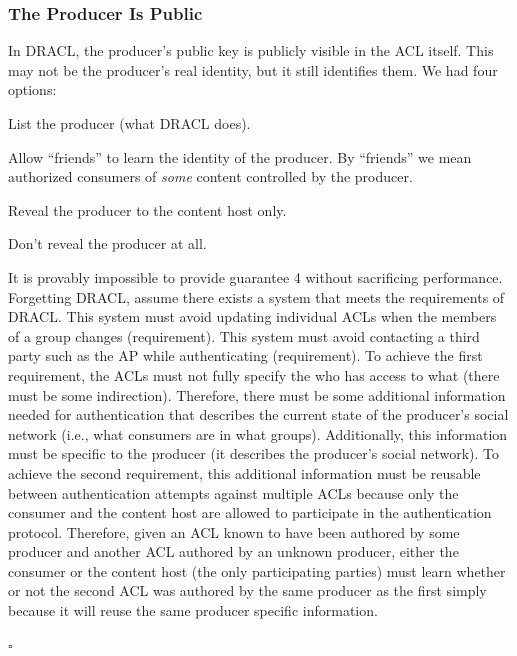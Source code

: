 \documentclass[pdftex,12pt,a4papaer,twoside,notitlepage]{report}
\begin{document}
\subsubsection{The Producer Is Public}
\label{sub:producer_public}

In DRACL, the producer's public key is publicly visible in the ACL itself. This
may not be the producer's real identity, but it still identifies them. We had
four options:

\begin{compactenum}
\item List the producer (what DRACL does).
\item Allow ``friends'' to learn the identity of the producer. By ``friends'' we
  mean authorized consumers of \emph{some} content controlled by the producer.
\item Reveal the producer to the content host only.
\item Don't reveal the producer at all.
\end{compactenum}

It is provably impossible to provide guarantee 4 without sacrificing
performance. Forgetting DRACL, assume there exists a system that meets the
requirements of DRACL. This system must avoid updating individual ACLs when the
members of a group changes (requirement). This system must avoid contacting a
third party such as the AP while authenticating (requirement). To achieve the
first requirement, the ACLs must not fully specify the who has access to what
(there must be some indirection). Therefore, there must be some additional
information needed for authentication that describes the current state of the
producer's social network (i.e., what consumers are in what groups).
Additionally, this information must be specific to the producer (it describes
the producer's social network). To achieve the second requirement, this
additional information must be reusable between authentication attempts against
multiple ACLs because only the consumer and the content host are allowed to
participate in the authentication protocol. Therefore, given an ACL known to
have been authored by some producer and another ACL authored by an unknown
producer, either the consumer or the content host (the only participating
parties) must learn whether or not the second ACL was authored by the same
producer as the first simply because it will reuse the same producer specific
information.

{\hfill $\square$}
\end{document}
